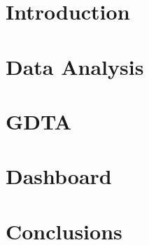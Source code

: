 \documentclass[11pt]{report}
\begin{document}


\chapter[Introduction]{Introduction}\label{ch:introduction}


\chapter[Data Analysis]{Data Analysis}\label{ch:data-analysis}


\chapter[GDTA]{GDTA}\label{ch:gdta}


\chapter[Dashboard]{Dashboard}\label{ch:dashboard}


\chapter[Conclusions]{Conclusions}\label{ch:conclusions}



\setcounter{page}{1}
\tableofcontents


\listoffigures
\listoftables
\end{document}
